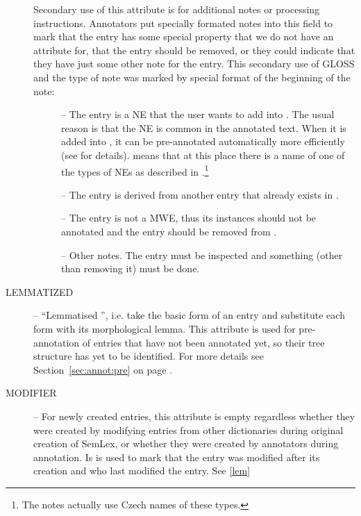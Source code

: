 \begin{description}
Secondary use of this attribute is for additional notes or processing instructions. Annotators put specially formated notes into this field to mark that the entry has some special property that we do not have an attribute for, that the entry should be removed, or they could indicate that they have just some other note for the entry. This secondary use of GLOSS and  the type of note was marked by special format of the beginning of the note:
    \begin{description}
    \item [] -- The entry is a NE that the user wants to add into \semlex. The usual reason is that the NE is common in the annotated text. When it is added into \semlex, it can be pre-annotated automatically more efficiently (see  for details).  means that at this place there is a name of one of the types of NEs as described in .\footnote{The notes actually use Czech names of these types.} 
    \item [] -- The entry is derived from another entry that already exists in \semlex. 
        \item [] -- The entry is not a MWE, thus its instances should not be annotated and the entry should be removed from \semlex.
        \item [] -- Other notes. The entry must be inspected and something (other than removing it) must be done.
  \end{description}
  
\item [LEMMATIZED] -- ``Lemmatised '', i.e. take the basic form of an entry and substitute each form with its morphological lemma. This attribute is used for pre-annotation of entries that have not been annotated yet, so their tree structure has yet to be identified. For more details see Section~\ref{sec:annot:pre}  on page \pageref{sec:annot:pre}.\label{lem}

\item [MODIFIER] -- For newly created entries, this attribute is empty regardless whether they were created by modifying entries from other dictionaries during original creation of SemLex, or whether they were created by annotators during annotation. Is is used to mark that the entry was modified after its creation and who last modified the entry. See \ref{lem}


\end{description}
